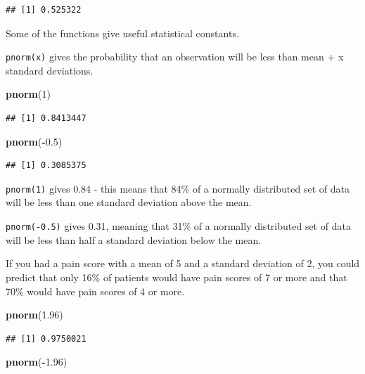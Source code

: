 \documentclass[]{book}
\newenvironment{Shaded}{\begin{snugshade}}{\end{snugshade}}
\newcommand{\DecValTok}[1]{\textcolor[rgb]{0.00,0.00,0.81}{#1}}
\newcommand{\FloatTok}[1]{\textcolor[rgb]{0.00,0.00,0.81}{#1}}
\newcommand{\KeywordTok}[1]{\textcolor[rgb]{0.13,0.29,0.53}{\textbf{#1}}}
\newcommand{\NormalTok}[1]{#1}
\newcommand{\OperatorTok}[1]{\textcolor[rgb]{0.81,0.36,0.00}{\textbf{#1}}}
\begin{document}
\begin{verbatim}
## [1] 0.525322
\end{verbatim}

Some of the functions give useful statistical constants.

\texttt{pnorm(x)} gives the probability that an observation will be less
than mean + x standard deviations.

\begin{Shaded}
\begin{Highlighting}[]
\KeywordTok{pnorm}\NormalTok{(}\DecValTok{1}\NormalTok{)}
\end{Highlighting}
\end{Shaded}

\begin{verbatim}
## [1] 0.8413447
\end{verbatim}

\begin{Shaded}
\begin{Highlighting}[]
\KeywordTok{pnorm}\NormalTok{(}\OperatorTok{-}\FloatTok{0.5}\NormalTok{)}
\end{Highlighting}
\end{Shaded}

\begin{verbatim}
## [1] 0.3085375
\end{verbatim}

\texttt{pnorm(1)} gives 0.84 - this means that 84\% of a normally
distributed set of data will be less than one standard deviation above
the mean.

\texttt{pnorm(-0.5)} gives 0.31, meaning that 31\% of a normally
distributed set of data will be less than half a standard deviation
below the mean.

If you had a pain score with a mean of 5 and a standard deviation of 2,
you could predict that only 16\% of patients would have pain scores of 7
or more and that 70\% would have pain scores of 4 or more.

\begin{Shaded}
\begin{Highlighting}[]
\KeywordTok{pnorm}\NormalTok{(}\FloatTok{1.96}\NormalTok{)}
\end{Highlighting}
\end{Shaded}

\begin{verbatim}
## [1] 0.9750021
\end{verbatim}

\begin{Shaded}
\begin{Highlighting}[]
\KeywordTok{pnorm}\NormalTok{(}\OperatorTok{-}\FloatTok{1.96}\NormalTok{)}
\end{Highlighting}
\end{Shaded}
\end{document}
